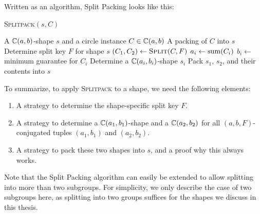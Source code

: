 \documentclass[a4paper,style=print,oneside,bibliography=totoc,nexus,lnum,extramargin]{tubsbook}
\begin{document}

Written as an algorithm, Split Packing looks like this:

\begin{algorithm}
    \caption{\textsc{Splitpack}$(s,C)$}
    \begin{algorithmic}
        \Require A $\mathbb{C}(a,b)$-shape $s$ and a circle instance $C \in \mathbb{C}(a,b)$
        \Ensure A packing of $C$ into $s$
        \State Determine split key $F$ for shape $s$
        \State $(C_1, C_2) \gets \textsc{Split}(C,F)$ 
            \State $a_i \gets \operatorname{sum}(C_i)$
            \State $b_i \gets$ minimum guarantee for $C_i$ 
            \State Determine a $\mathbb{C}(a_i, b_i)$-shape $s_i$
            \State {}
        \EndFor
        \State Pack $s_1$, $s_2$, and their contents into $s$
    \end{algorithmic}
\end{algorithm}

To summarize, to apply \textsc{Splitpack} to a shape, we need the following elements:

\begin{enumerate}
    \item A strategy to determine the shape-specific split key $F$.
    \item A strategy to determine a $\mathbb{C}(a_1, b_1)$-shape and a $\mathbb{C}(a_2, b_2)$ for all $(a,b,F)$-conjugated tuples $(a_1, b_1)$ and $(a_2, b_2)$.
    \item A strategy to pack these two shapes into $s$, and a proof why this always works.
\end{enumerate}

Note that the Split Packing algorithm can easily be extended to allow splitting into more than two subgroups. For simplicity, we only describe the case of two subgroups here, as splitting into two groups suffices for the shapes we discuss in this thesis.


\end{document}
